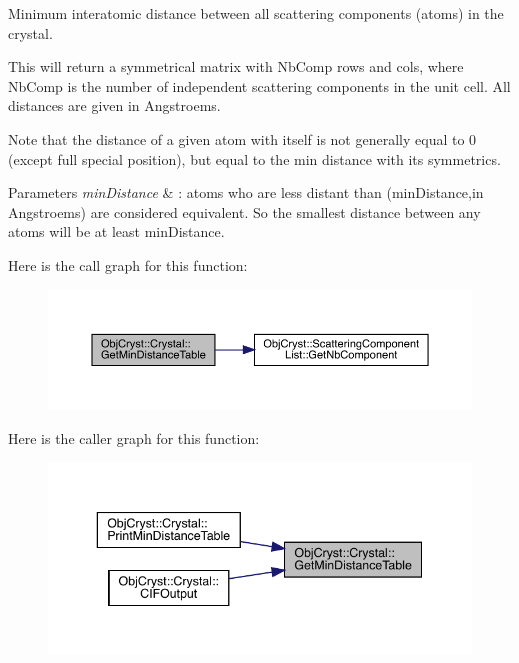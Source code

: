 Minimum interatomic distance between all scattering components (atoms) in the crystal. 

This will return a symmetrical matrix with Nb\+Comp rows and cols, where Nb\+Comp is the number of independent scattering components in the unit cell. All distances are given in Angstroems.

Note that the distance of a given atom with \textquotesingle{}itself\textquotesingle{} is not generally equal to 0 (except full special position), but equal to the min distance with its symmetrics.


\begin{DoxyParams}{Parameters}
{\em min\+Distance} & \+: atoms who are less distant than (min\+Distance,in Angstroems) are considered equivalent. So the smallest distance between any atoms will be at least min\+Distance. \\
\hline
\end{DoxyParams}
Here is the call graph for this function\+:
\nopagebreak
\begin{figure}[H]
\begin{center}
\leavevmode
\includegraphics[width=350pt]{class_obj_cryst_1_1_crystal_a26c8dfab558f79522c3ab31babd4720e_cgraph}
\end{center}
\end{figure}
Here is the caller graph for this function\+:
\nopagebreak
\begin{figure}[H]
\begin{center}
\leavevmode
\includegraphics[width=343pt]{class_obj_cryst_1_1_crystal_a26c8dfab558f79522c3ab31babd4720e_icgraph}
\end{center}
\end{figure}
\mbox{\label{class_obj_cryst_1_1_crystal_ab991f8f3cc005760f939f7d41694cfdf}} 
